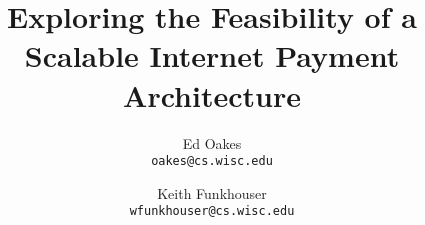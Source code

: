 \documentclass[letterpaper,twocolumn,10pt]{article}
\begin{document}
\date{}

\title{\Large \bf Exploring the Feasibility of a Scalable Internet Payment Architecture}

\author{
{\rm Ed Oakes} \\
{\rm \texttt{oakes@cs.wisc.edu}}
\and
{\rm Keith Funkhouser} \\
{\rm \texttt{wfunkhouser@cs.wisc.edu}}
}

\maketitle



{\footnotesize 
}

\end{document}

